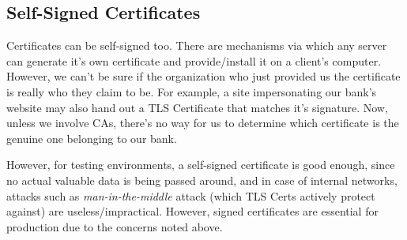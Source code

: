 \subsection{Self-Signed Certificates}
Certificates can be self-signed too. There are mechanisms via which any server can generate it's own certificate and provide/install it on a client's computer. However, we can't be sure if the organization who just provided us the certificate is really who they claim to be. For example, a site impersonating our bank's website may also hand out a TLS Certificate that matches it's signature. Now, unless we involve CAs, there's no way for us to determine which certificate is the genuine one belonging to our bank. 

However, for testing environments, a self-signed certificate is good enough, since no actual valuable data is being passed around, and in case of internal networks, attacks such as \textit{man-in-the-middle} attack (which TLS Certs actively protect against) are useless/impractical. However, signed certificates are essential for production due to the concerns noted above. 